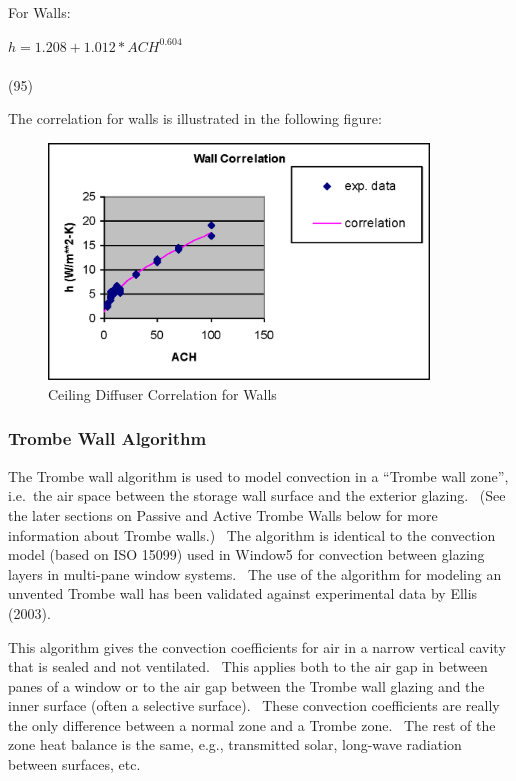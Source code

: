 For Walls:

\(h = 1.208 + 1.012 * AC{H^{0.604}}\) ~~~~~~~~~~~~~~~~~~~~~~~~~~~~~~~~~~~~~~~~~~~~~~~~~~~~~~~~~~~~~~~~~~~~~ (95)

The correlation for walls is illustrated in the following figure:

\begin{figure}[hbtp] %
\centering
\includegraphics[width=0.9\textwidth, height=0.9\textheight, keepaspectratio=true]{media/image382.png}
\caption{  Ceiling Diffuser Correlation for Walls \protect \label{fig:ceiling-diffuser-correlation-for-walls}}
\end{figure}

\subsubsection{Trombe Wall Algorithm}\label{trombe-wall-algorithm}

The Trombe wall algorithm is used to model convection in a ``Trombe wall zone'', i.e.~the air space between the storage wall surface and the exterior glazing.~ (See the later sections on Passive and Active Trombe Walls below for more information about Trombe walls.)~ The algorithm is identical to the convection model (based on ISO 15099) used in Window5 for convection between glazing layers in multi-pane window systems.~ The use of the algorithm for modeling an unvented Trombe wall has been validated against experimental data by Ellis (2003).

This algorithm gives the convection coefficients for air in a narrow vertical cavity that is sealed and not ventilated.~ This applies both to the air gap in between panes of a window or to the air gap between the Trombe wall glazing and the inner surface (often a selective surface).~ These convection coefficients are really the only difference between a normal zone and a Trombe zone.~ The rest of the zone heat balance is the same, e.g., transmitted solar, long-wave radiation between surfaces, etc.

